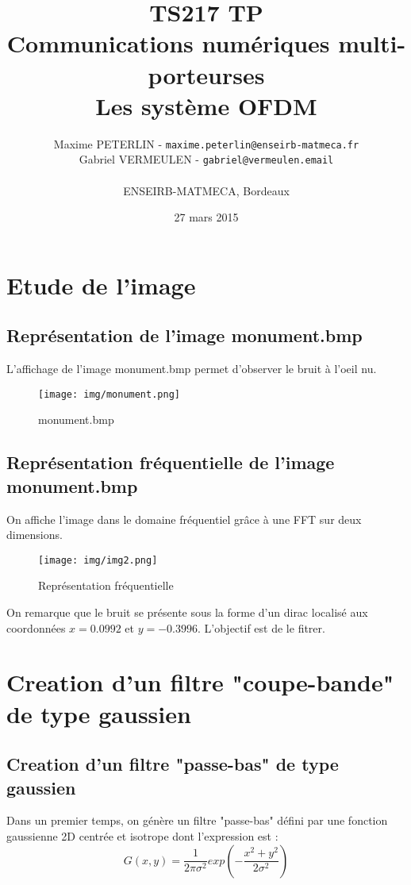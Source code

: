 \documentclass[11pt]{article}
\title{\textbf{TS217 TP}\\Communications numériques multi-porteurses\\Les système OFDM}
\author{Maxime PETERLIN - \texttt{maxime.peterlin@enseirb-matmeca.fr}\\
Gabriel VERMEULEN - \texttt{gabriel@vermeulen.email} \\\\{ENSEIRB-MATMECA, Bordeaux}}
\date{27 mars 2015}
\begin{document}
\maketitle
\tableofcontents

\newpage

\section{Etude de l'image}

	\subsection{Représentation de l'image monument.bmp}

		L'affichage de l'image monument.bmp permet d'observer le bruit à l'oeil nu.

		\begin{figure}[h]
			\centering
			\texttt{[image: img/monument.png]}
			\caption{monument.bmp}
			\label{img1}
		\end{figure}

	\subsection{Représentation fréquentielle de l'image monument.bmp}

		On affiche l'image dans le domaine fréquentiel grâce à une FFT sur deux dimensions.
		
		\begin{figure}[h]
			\centering
			\texttt{[image: img/img2.png]}
			\caption{Représentation fréquentielle}
			\label{img2}
		\end{figure}
		
		On remarque que le bruit se présente sous la forme d'un dirac localisé aux coordonnées $x=0.0992$ et $y=-0.3996$. L'objectif est de le fitrer.

\section{Creation d'un filtre "coupe-bande" de type gaussien}

	\subsection{Creation d'un filtre "passe-bas" de type gaussien}
	
	Dans un premier temps, on génère un filtre "passe-bas" défini par une fonction gaussienne 2D centrée et isotrope dont l'expression est :
	\[ G(x,y) = \frac{1}{2\pi\sigma^2}exp({-\frac{x^2+y^2}{2\sigma^2}}) \]
\end{document}
